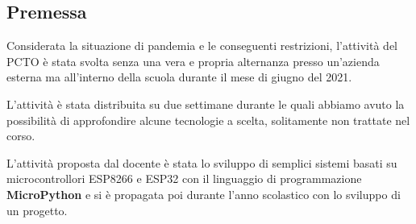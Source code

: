 \subsection{Premessa}
Considerata la situazione di pandemia e le conseguenti restrizioni, l'attività
del PCTO è stata svolta senza una vera e propria alternanza presso un'azienda
esterna ma all'interno della scuola durante il mese di giugno del 2021.

L'attività è stata distribuita su due settimane durante le quali abbiamo avuto
la possibilità di approfondire alcune tecnologie a scelta, solitamente
non trattate nel corso.

L'attività proposta dal docente è stata lo sviluppo di semplici sistemi basati
su microcontrollori ESP8266 e ESP32 con il linguaggio di programmazione
\textbf{MicroPython} e si è propagata poi durante l'anno scolastico con lo
sviluppo di un progetto.
